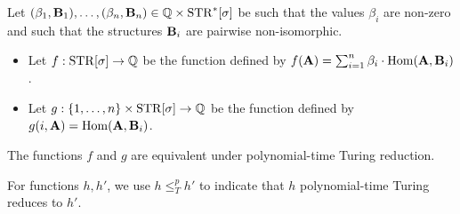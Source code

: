 \documentclass[11pt]{article}
\begin{document}
\begin{theorem}
\label{thm:turing-equivalent}
Let $(\beta_1,\mathbf{B}_1),\ldots,(\beta_n,\mathbf{B}_n) \in \mathbb{Q} \times \mathrm{STR}^*[\sigma]$
be such that the values $\beta_i$ are non-zero and such that 
the structures $\mathbf{B}_i$ are pairwise non-isomorphic.
\begin{itemize}

\item 
Let $f: \mathrm{STR}[\sigma] \to \mathbb{Q}$ be the function defined by
$f(\mathbf{A}) = \sum_{i=1}^n \beta_i \cdot \mathrm{Hom}(\mathbf{A},\mathbf{B}_i)$.

\item
Let $g: \{ 1, \ldots, n \} \times \mathrm{STR}[\sigma] \to \mathbb{Q}$
be the function defined by
$g(i,\mathbf{A}) = \mathrm{Hom}(\mathbf{A},\mathbf{B}_i)$.

\end{itemize}
The functions $f$ and $g$ are equivalent under polynomial-time
Turing reduction.
\end{theorem}

\newcommand{\tred}{\leq_T^p}
For functions $h, h'$,
we use $h \tred h'$ to indicate that $h$ polynomial-time Turing 
reduces to $h'$.
\end{document}
